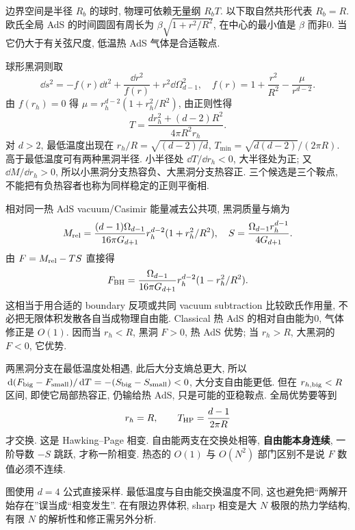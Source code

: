 边界空间是半径 $R_b$ 的球时, 物理可依赖无量纲 $R_bT$. 以下取自然共形代表 $R_b=R$. 欧氏全局 AdS 的时间圆固有周长为 $\beta\sqrt{1+r^2/R^2}$, 在中心的最小值是 $\beta$ 而非0. 当它仍大于有关弦尺度, 低温热 AdS 气体是合适鞍点.

球形黑洞则取
\[
\dd s^2=-f(r)\dd t^2+\frac{\dd r^2}{f(r)}+r^2\dd\Omega_{d-1}^2,
\quad f(r)=1+\frac{r^2}{R^2}-\frac\mu{r^{d-2}}.
\]
由 $f(r_h)=0$ 得 $\mu=r_h^{d-2}(1+r_h^2/R^2)$, 由正则性得
\[
T=\frac{dr_h^2+(d-2)R^2}{4\pi R^2r_h}.
\]
对 $d>2$, 最低温度出现在 $r_h/R=\sqrt{(d-2)/d}$, $T_{\min}=\sqrt{d(d-2)}/(2\pi R)$. 高于最低温度可有两种黑洞半径. 小半径处 $\dd T/\dd r_h<0$, 大半径处为正; 又 $\dd M/\dd r_h>0$, 所以小黑洞分支热容负、大黑洞分支热容正. 三个候选是三个鞍点, 不能把有负热容者也称为同样稳定的正则平衡相.

相对同一热 AdS vacuum/Casimir 能量减去公共项, 黑洞质量与熵为
\[
M_{\rm rel}=\frac{(d-1)\Omega_{d-1}}{16\pi G_{d+1}}
r_h^{d-2}(1+r_h^2/R^2),\quad
S=\frac{\Omega_{d-1}r_h^{d-1}}{4G_{d+1}}.
\]
由 $F=M_{\rm rel}-TS$ 直接得
\[
F_{\rm BH}=\frac{\Omega_{d-1}}{16\pi G_{d+1}}
r_h^{d-2}(1-r_h^2/R^2).
\]
这相当于用合适的 boundary 反项或共同 vacuum subtraction 比较欧氏作用量, 不必把无限体积发散各自当成物理自由能. Classical 热 AdS 的相对自由能为0, 气体修正是 $O(1)$. 因而当 $r_h<R$, 黑洞 $F>0$, 热 AdS 优势; 当 $r_h>R$, 大黑洞的 $F<0$, 它优势.

两黑洞分支在最低温度处相遇, 此后大分支熵总更大, 所以 $\,\mathrm d(F_{\rm big}-F_{\rm small})/\,\mathrm d T=-(S_{\rm big}-S_{\rm small})<0$, 大分支自由能更低. 但在 $r_{h,\rm big}<R$ 区间, 即使它局部热容正, 仍输给热 AdS, 只是可能的亚稳鞍点. 全局优势要等到
\[
r_h=R,\qquad T_{\rm HP}=\frac{d-1}{2\pi R}
\]
才交换. 这是 Hawking--Page 相变. 自由能两支在交换处相等, \textbf{自由能本身连续}, 一阶导数 $-S$ 跳跃, 才称一阶相变. 热态的 $O(1)$ 与 $O(N^2)$ 部门区别不是说 $F$ 数值必须不连续.

\begin{center}
\end{center}
图使用 $d=4$ 公式直接采样. 最低温度与自由能交换温度不同, 这也避免把“两解开始存在”误当成“相变发生”. 在有限边界体积, sharp 相变是大 $N$ 极限的热力学结构, 有限 $N$ 的解析性和修正需另外分析.

